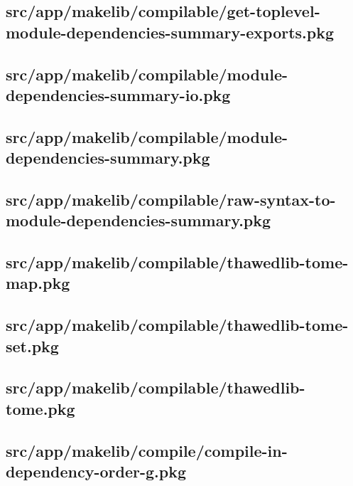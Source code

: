 \subsection{src/app/makelib/compilable/get-toplevel-module-dependencies-summary-exports.pkg}


\subsection{src/app/makelib/compilable/module-dependencies-summary-io.pkg}


\subsection{src/app/makelib/compilable/module-dependencies-summary.pkg}


\subsection{src/app/makelib/compilable/raw-syntax-to-module-dependencies-summary.pkg}


\subsection{src/app/makelib/compilable/thawedlib-tome-map.pkg}


\subsection{src/app/makelib/compilable/thawedlib-tome-set.pkg}


\subsection{src/app/makelib/compilable/thawedlib-tome.pkg}


\subsection{src/app/makelib/compile/compile-in-dependency-order-g.pkg}


